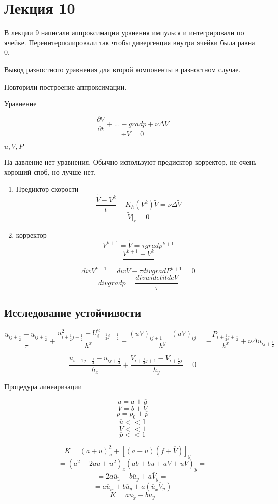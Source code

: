 \documentclass[12pt, a4paper]{article}
\begin{document}
\section{Лекция 10}

В лекции 9 написали аппроксимации уранения импулься и интегрировали по ячейке.
Переинтерполировали так чтобы дивергенция внутри ячейки была равна 0.

Вывод разностного уравнения для второй компоненты в разностном случае.

Повторили построение аппроксимации.

Уравнение

\[ \frac{\partial V}{\partial t} + ... - grad p + \nu \Delta V \]
\[ \div V = 0 \]

$u, V, P$

На давление нет уравнения. Обычно используют предисктор-корректор, не очень хороший споб, но лучше нет.

\begin{enumerate}
	\item Предиктор скорости
	\[ \frac{\widetilde{V} - V^k}{t} + K_h (V^k) \widetilde{V} = \nu \Delta \widetilde{V} \]
	\[ \widetilde{V}|_r = 0 \]
	\item корректор
	\[ V^{k+1} = \widetilde{V} = \tau grad p^{k+1} \]
	\[ \frac{V^{k+1}-V^k}{} \]
	\[ div V^{k+1} = div \widetilde{V} - \tau div grad P^{k+1} = 0 \]
	\[ div grad p = \frac{div widetilde{V}}{\tau} \]
\end{enumerate}

\subsection{Исследование устойчивости}

\[ \frac{\hat{u}_{ij+\frac{1}{2}} - u_{ij+\frac{1}{2}}}{\tau} + \frac{u^2_{i+\frac{1}{2}j+\frac{1}{2}} - U^2_{i-\frac{1}{2}j+\frac{1}{2}}}{h^x} + \frac{(uV)_{ij+1} - (uV)_{ij}}{h^y} = - \frac{P_{i+\frac{1}{2}j+\frac{1}{2}}}{h^x} + \nu \Delta u_{ij+\frac{1}{2}} \]

\[ \frac{u_{i+1j+\frac{1}{2}} - u_{ij+\frac{1}{2}}}{h_x} + \frac{V_{i+\frac{1}{2}j+1}-V_{i+\frac{1}{2}j}}{h_y} = 0 \]

Процедура линеаризации

\[ u = a + \overline{u} \]
\[ V = b + \overline{V} \]
\[ p = p_0 + \overline{p} \]
\[ \overline{u} << 1 \]
\[ \overline{V} << 1 \]
\[ \overline{p} << 1 \]

\[ K= (a + \overline{u})^2_{\overline{x}} + {[(a + \overline{u})(f+\overline{V})]}_y = \]
\[ = (a^2 + 2a \overline{u} + \overline{u}^2)_{\widetilde{x}} (ab + b \overline{u} + a \overline{V} + \overline{u} \overline{V})_y = \]
\[ = 2 a \overline{u}_{\widetilde{x}} + b \overline{u}_y + a \overline{V}_y = \]
\[ = a \overline{u}_{\widetilde{x}} + b \overline{u}_y + a(\overline{u}_{\widetilde{x}}\overline{V}_y) \]
\[ K = a \overline{u}_{\widetilde{x}} + b \overline{u}_y \]
\end{document}
